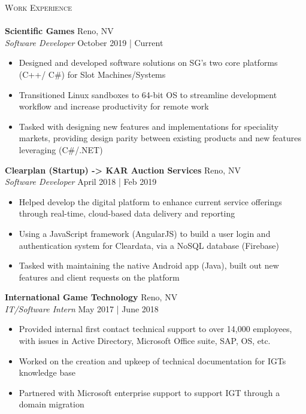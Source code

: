 \documentclass[a4paper]{article}
\newcommand{\lineunder} {
    \vspace*{-8pt} \\
    \hspace*{-18pt} \hrulefill \\
}
\newcommand{\header} [1] {
    {\hspace*{-18pt}\vspace*{6pt} \textsc{#1}}
    \vspace*{-6pt} \lineunder
}
\begin{document}
\header{Work Experience}
\vspace{1mm}
\textbf{Scientific Games} \hfill Reno, NV\\
\textit{Software Developer } \hfill October 2019 | Current\\
\vspace{-1mm}
\begin{itemize} \itemsep 1pt
	\item Designed and developed software solutions on SG's two core platforms (C++/ C\#) for Slot Machines/Systems 
	\item Transitioned Linux sandboxes to 64-bit OS to streamline development workflow and increase productivity for remote work
	\item Tasked with designing new features and implementations for speciality markets, providing design parity between existing products and new features leveraging (C\#/.NET)
\end{itemize}
\textbf{Clearplan (Startup) -> KAR Auction Services} \hfill Reno, NV\\
\textit{Software Developer } \hfill April 2018 | Feb 2019\\
\vspace{-1mm}
\begin{itemize} \itemsep 1pt
	\item Helped develop the digital platform to enhance current service offerings through real-time, cloud-based data delivery and reporting   
	\item Using a JavaScript framework (AngularJS) to build a user login and authentication system for Cleardata, via a \textquotedbl{}NoSQL\textquotedbl{} database (Firebase)
	\item Tasked with maintaining the native Android app (Java), built out new features and client requests on the platform
\end{itemize}
\textbf{International Game Technology} \hfill Reno, NV\\
\textit{IT/Software Intern} \hfill May 2017 | June 2018\\
\vspace{-1mm}
\begin{itemize} \itemsep 1pt
	\item Provided internal first contact technical support to over 14,000 employees, with issues in Active Directory, Microsoft Office suite, SAP, OS, etc.
	\item Worked on the creation and upkeep of technical documentation for IGT\textquotesingle{}s knowledge base
	\item Partnered with Microsoft enterprise support to support IGT through a domain migration
\end{itemize}
\end{document}
